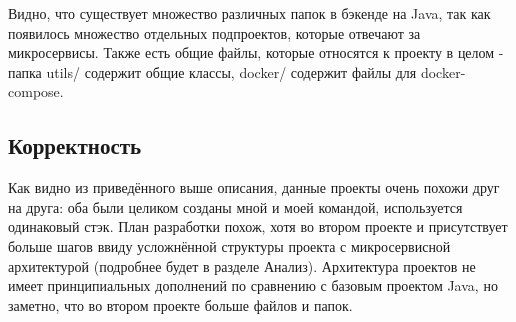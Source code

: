     Видно, что существует множество различных папок в бэкенде на Java, так как появилось множество отдельных подпроектов, которые отвечают за микросервисы. Также есть общие файлы, которые относятся к проекту в целом - папка utils/ содержит общие классы, docker/ содержит файлы для docker-compose.



    \subsection{Корректность}
    Как видно из приведённого выше описания, данные проекты очень похожи друг на друга: оба были целиком созданы мной и моей командой, используется одинаковый стэк. План разработки похож, хотя во втором проекте и присутствует больше шагов ввиду усложнённой структуры проекта с микросервисной архитектурой (подробнее будет в разделе Анализ). Архитектура проектов не имеет принципиальных дополнений по сравнению с базовым проектом Java, но заметно, что во втором проекте больше файлов и папок.



\clearpage
